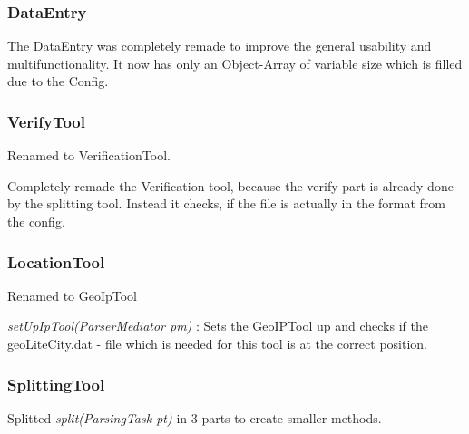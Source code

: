 \subsubsection{DataEntry}

The DataEntry was completely remade to improve the general usability and multifunctionality. It now has only an Object-Array of variable size
which is filled due to the Config.

\subsubsection{VerifyTool}

Renamed to VerificationTool. \newline\newline

Completely remade the Verification tool, because the verify-part is already done by the splitting tool. Instead it checks, if the 
file is actually in the format from the config.

\subsubsection{LocationTool}

Renamed to GeoIpTool\newline\newline

\textit{setUpIpTool(ParserMediator pm)} : Sets the GeoIPTool up and checks if the geoLiteCity.dat - file which is needed for this tool
is at the correct position.

\subsubsection{SplittingTool}

Splitted \textit{split(ParsingTask pt)} in 3 parts to create smaller methods.

